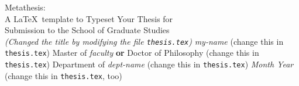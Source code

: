 \documentclass[dvips,letterpaper,12pt]{report}
\begin{document}

\thesistitle
	{Metathesis: \\
	 A \LaTeX\ template to Typeset Your Thesis for \\
	 Submission to the School of Graduate Studies  \\
	 \footnotesize{\sl (Changed the title by modifying the file
	  \texttt{thesis.tex})}}
	{\emph{my-name} (change this in \texttt{thesis.tex})}
	{Master of \emph{faculty} \textbf{or} Doctor of Philosophy
	 (change this in \texttt{thesis.tex})}
	{Department of \emph{dept-name}
	 (change this in \texttt{thesis.tex})}
	{\emph{Month Year} (change this in \texttt{thesis.tex}, too)}
















\appendix

\end{document}
